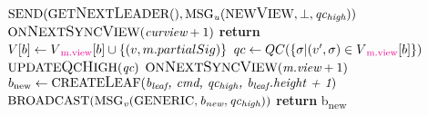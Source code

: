 \begin{algorithm}[h!]
\begin{algorithmic}[1]
				\State $\text{SEND}(\text{GET{\large N}EXT{\large L}EADER}(), \text{MSG}\textsubscript{\textit{u}}(\text{NEW{\large V}IEW}, \bot, \textit{qc\textsubscript{high}}))$
					\State $\text{ON{\large N}EXT{\large S}YNC{\large V}IEW}(\textit{curview} + 1)$
				\EndIf
			\EndIf
		\EndIf
		\color{black}
	\EndProcedure
		\color{Green}
			\color{black}
				\State \textbf{return}
			\EndIf
			\State $V[b] \gets V\textcolor{Magenta}{\textsubscript{m.view}}[b] \cup \{(v, m.partialSig)\}$
				\State $qc \gets QC(\{ \sigma | (v', \sigma) \in V\textcolor{Magenta}{\textsubscript{m.view}}[b]\})$
				\State $ \text{UPDATE{\large Q}C{\large H}IGH}(\textit{qc}) $
				\color{Green}
				\State $\text{ON{\large N}EXT{\large S}YNC{\large V}IEW}(\textit{m.view} + 1)$
				\color{black}
			\EndIf
		\EndIf
	\EndProcedure
		\State $b\textsubscript{new} \gets \text{CREATE{\large L}EAF}(\textit{b\textsubscript{leaf}, \textit{cmd}, \textit{qc\textsubscript{high}}, \textit{b\textsubscript{leaf}.height} + 1})$
		\State $ \text{BROADCAST}(\text{MSG}\textsubscript{\textit{v}}(\text{GENERIC}, \textit{b\textsubscript{new}}, \textit{qc\textsubscript{high}})) $
		\State \textbf{return} b\textsubscript{new}
	\EndFunction
	\end{algorithmic}
\end{algorithm}

